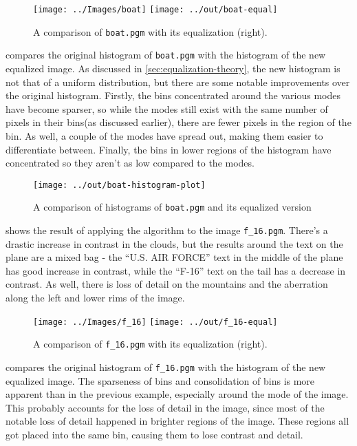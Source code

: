 \documentclass[headings=optiontoheadandtoc,listof=totoc,parskip=full]{scrartcl}
\begin{document}
\begin{figure}[H]
	\centering
	\texttt{[image: ../Images/boat]}
	\texttt{[image: ../out/boat-equal]}
	\caption{A comparison of \texttt{boat.pgm} with its equalization (right).}
	\label{fig:equal-result-1}
\end{figure}

 compares the original histogram of \texttt{boat.pgm} with the histogram of the new equalized image. As discussed in \cref{sec:equalization-theory}, the new histogram is not that of a uniform distribution, but there are some notable improvements over the original histogram. Firstly, the bins concentrated around the various modes have become sparser, so while the modes still exist with the same number of pixels in their bins(as discussed earlier), there are fewer pixels in the region of the bin. As well, a couple of the modes have spread out, making them easier to differentiate between. Finally, the bins in lower regions of the histogram have concentrated so they aren't as low compared to the modes.

\begin{figure}[H]
	\centering\texttt{[image: ../out/boat-histogram-plot]}
	\caption{A comparison of histograms of \texttt{boat.pgm} and its equalized version}
	\label{fig:equal-histogram-1}
\end{figure}

 shows the result of applying the algorithm to the image \texttt{f\_16.pgm}. There's a drastic increase in contrast in the clouds, but the results around the text on the plane are a mixed bag - the ``U.S. AIR FORCE'' text in the middle of the plane has good increase in contrast, while the ``F-16'' text on the tail has a decrease in contrast. As well, there is loss of detail on the mountains and the aberration along the left and lower rims of the image.

\begin{figure}[H]
	\centering
	\texttt{[image: ../Images/f\_16]}
	\texttt{[image: ../out/f\_16-equal]}
	\caption{A comparison of \texttt{f\_16.pgm} with its equalization (right).}
	\label{fig:equal-result-2}
\end{figure}

 compares the original histogram of \texttt{f\_16.pgm} with the histogram of the new equalized image. The sparseness of bins and consolidation of bins is more apparent than in the previous example, especially around the mode of the image. This probably accounts for the loss of detail in the image, since most of the notable loss of detail happened in brighter regions of the image. These regions all got placed into the same bin, causing them to lose contrast and detail.
\end{document}
